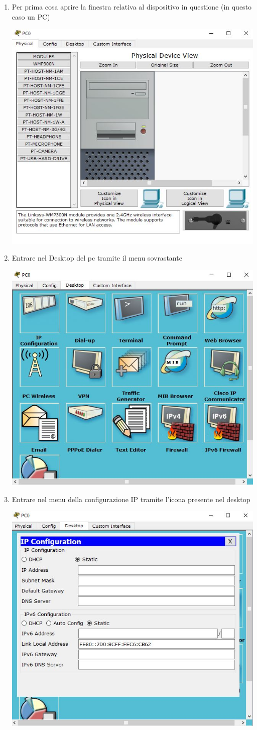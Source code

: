 \begin{enumerate}
    \item Per prima cosa aprire la finestra relativa al dispositivo in questione (in questo caso un PC)\par
    \begin{sfigure}
        \includegraphics[width=0.6\linewidth]{images/07.routing-sicurezza/routing-statico/01.open-pc.jpg}
    \end{sfigure}
    \item Entrare nel Desktop del pc tramite il menu sovrastante\par
    \begin{sfigure}
        \includegraphics[width=0.6\linewidth]{images/07.routing-sicurezza/routing-statico/02.desktop-tab.jpg}
    \end{sfigure}
    \item Entrare nel menu della configurazione IP tramite l’icona presente nel desktop\par
    \begin{sfigure}
        \includegraphics[width=0.6\linewidth]{images/07.routing-sicurezza/routing-statico/03.ip-config.jpg}

\end{sfigure}
\end{enumerate}

